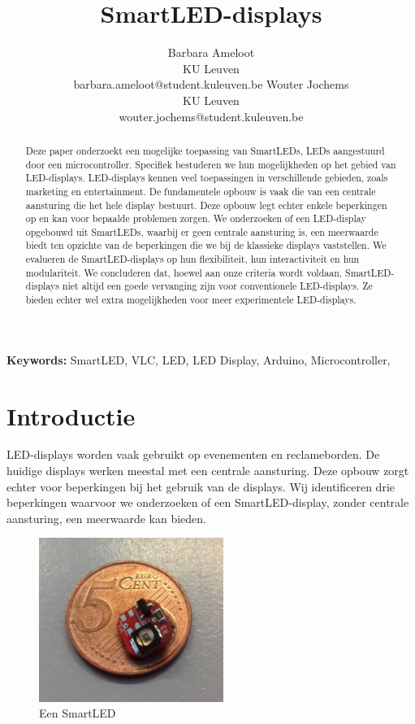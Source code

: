 \documentclass{article}
\title{SmartLED-displays}
\author{Barbara Ameloot\\
KU Leuven\\
barbara.ameloot@student.kuleuven.be
\And 
Wouter Jochems\\
KU Leuven\\
wouter.jochems@student.kuleuven.be}
\begin{document}
\fontsize{11pt}{13pt}\selectfont
\maketitle

\begin{abstract}
Deze paper onderzoekt een mogelijke toepassing van SmartLEDs, LEDs aangestuurd door een microcontroller\cite{smartLED}. Specifiek bestuderen we hun mogelijkheden op het gebied van LED-displays. LED-displays kennen veel toepassingen in verschillende gebieden, zoals marketing en entertainment. De fundamentele opbouw is vaak die van een centrale aansturing die het hele display bestuurt. Deze opbouw legt echter enkele beperkingen op en kan voor bepaalde problemen zorgen. We onderzoeken of een LED-display opgebouwd uit SmartLEDs, waarbij er geen centrale aansturing is, een meerwaarde biedt ten opzichte van de beperkingen die we bij de klassieke displays vaststellen. We evalueren de SmartLED-displays op hun flexibiliteit, hun interactiviteit en hun modulariteit. We concluderen dat, hoewel aan onze criteria wordt voldaan,  SmartLED-displays niet altijd een goede vervanging zijn voor conventionele LED-displays. Ze bieden echter wel extra mogelijkheden voor meer experimentele LED-displays.
\end{abstract}

{\bf Keywords:} SmartLED, VLC, LED, LED Display, Arduino, Microcontroller,


\section{Introductie}

LED-displays worden vaak gebruikt op evenementen en reclameborden. De huidige displays werken meestal met een centrale aansturing. Deze opbouw zorgt echter voor beperkingen bij het gebruik van de displays. Wij identificeren drie beperkingen waarvoor we onderzoeken of een SmartLED-display, zonder centrale aansturing, een meerwaarde kan bieden.

\begin{figure}
\centering
\includegraphics[width=6cm]{SmartLED.png}
\caption{Een SmartLED}
\end{figure}
\end{document}
